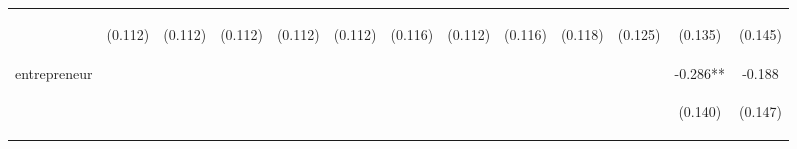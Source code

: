 \begin{center}
\begin{tabular}{lcccccccccccc}
\vspace{4pt} & \begin{footnotesize}(0.112)\end{footnotesize} & \begin{footnotesize}(0.112)\end{footnotesize} & \begin{footnotesize}(0.112)\end{footnotesize} & \begin{footnotesize}(0.112)\end{footnotesize} & \begin{footnotesize}(0.112)\end{footnotesize} & \begin{footnotesize}(0.116)\end{footnotesize} & \begin{footnotesize}(0.112)\end{footnotesize} & \begin{footnotesize}(0.116)\end{footnotesize} & \begin{footnotesize}(0.118)\end{footnotesize} & \begin{footnotesize}(0.125)\end{footnotesize} & \begin{footnotesize}(0.135)\end{footnotesize} & \begin{footnotesize}(0.145)\end{footnotesize} \\
entrepreneur &  &  &  &  &  &  &  &  &  &  & -0.286** & -0.188 \\
\vspace{4pt} & \begin{footnotesize}\end{footnotesize} & \begin{footnotesize}\end{footnotesize} & \begin{footnotesize}\end{footnotesize} & \begin{footnotesize}\end{footnotesize} & \begin{footnotesize}\end{footnotesize} & \begin{footnotesize}\end{footnotesize} & \begin{footnotesize}\end{footnotesize} & \begin{footnotesize}\end{footnotesize} & \begin{footnotesize}\end{footnotesize} & \begin{footnotesize}\end{footnotesize} & \begin{footnotesize}(0.140)\end{footnotesize} & \begin{footnotesize}(0.147)\end{footnotesize} \\

\end{tabular}
\end{center}

